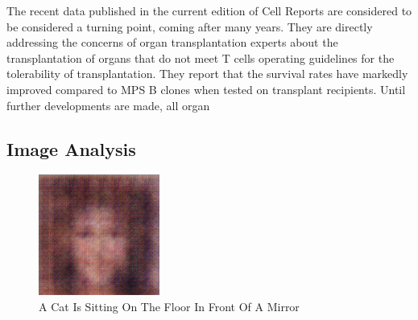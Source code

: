 \documentclass{article}%
\begin{document}
The recent data published in the current edition of Cell Reports are considered to be considered a turning point, coming after many years. They are directly addressing the concerns of organ transplantation experts about the transplantation of organs that do not meet T cells operating guidelines for the tolerability of transplantation. They report that the survival rates have markedly improved compared to MPS B clones when tested on transplant recipients.\newline%
Until further developments are made, all organ

%
\subsection{Image Analysis}%
\label{subsec:ImageAnalysis}%


\begin{figure}[h!]%
\centering%
\includegraphics[width=150px]{500_fake_images/samples_5_480.png}%
\caption{A Cat Is Sitting On The Floor In Front Of A Mirror}%
\end{figure}

%
\end{document}
